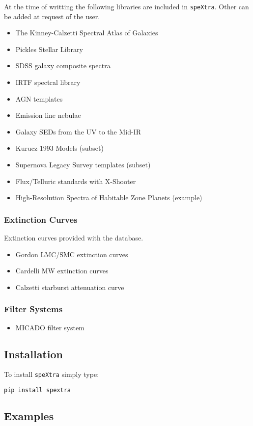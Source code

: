 At the time of writting the following libraries are included in \texttt{speXtra}. Other can be added 
at request of the user. 

\begin{itemize}

    \item The Kinney-Calzetti Spectral Atlas of Galaxies

    \item Pickles Stellar Library

    \item SDSS galaxy composite spectra

    \item IRTF spectral library

    \item AGN templates

    \item Emission line nebulae

    \item Galaxy SEDs from the UV to the Mid-IR

    \item Kurucz 1993 Models (subset)

    \item Supernova Legacy Survey templates (subset)

    \item Flux/Telluric standards with X-Shooter

    \item High-Resolution Spectra of Habitable Zone Planets (example)


\end{itemize}

\subsubsection{Extinction Curves}

Extinction curves provided with the database. 

\begin{itemize}
    \item Gordon LMC/SMC extinction curves
    
    \item Cardelli MW extinction curves
    
    \item Calzetti starburst attenuation curve
\end{itemize}


\subsubsection{Filter Systems}

\begin{itemize}
    \item MICADO filter system
\end{itemize}


\subsection{Installation}

To install \texttt{speXtra} simply type: 

\texttt{pip install spextra}

 


\subsection{Examples%
  \label{examples}%
}
